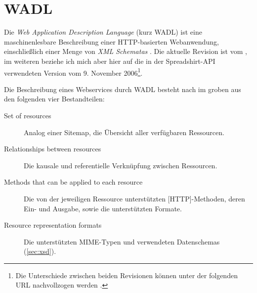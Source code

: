 \section{WADL}
\label{sec:wadl}

Die \emph{Web Application Description Language} (kurz \gls{WADL}) ist eine maschinenlesbare Beschreibung einer HTTP-basierten Webanwendung, einschließlich einer Menge von \emph{XML Schematas} \cite{hadleyWADL}.
Die aktuelle Revision ist vom , im weiteren beziehe ich mich aber hier auf die in der Spreadshirt-API verwendeten Version vom 9. November 2006\footnote{Die Unterschiede zwischen beiden Revisionen können unter der folgenden URL nachvollzogen werden .}.

Die Beschreibung eines Webservices durch WADL besteht nach \cite{hadleyWADL} im groben aus den folgenden vier Bestandteilen:
\begin{description}
     \item[Set of resources] Analog einer Sitemap, die Übersicht aller verfügbaren Ressourcen.
     \item[Relationships between resources] Die kausale und referentielle Verknüpfung zwischen Ressourcen.
     \item[Methods that can be applied to each resource] Die von der jeweiligen Ressource unterstützten [HTTP]-Methoden, deren Ein- und Ausgabe, sowie die unterstützten Formate.
     \item[Resource representation formats] Die unterstützten \gls{MIME}-Typen und verwendeten Datenschemas (\cref{sec:xsd}).
 \end{description} 

